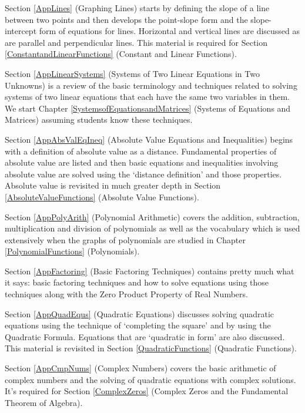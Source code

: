 \medskip

Section \ref{AppLines} (Graphing Lines) starts by defining the slope of a line between two points and then develops the point-slope form and the slope-intercept form of equations for lines.  Horizontal and vertical lines are discussed as are parallel and perpendicular lines.  This material is required for Section \ref{ConstantandLinearFunctions} (Constant and Linear Functions).

\medskip

Section \ref{AppLinearSystems} (Systems of Two Linear Equations in Two Unknowns) is a review of the basic terminology and techniques related to solving systems of two linear equations that each have the same two variables in them.  We start Chapter \ref{SystemsofEquationsandMatrices} (Systems of Equations and Matrices) assuming students know these techniques.

\medskip

Section \ref{AppAbsValEqIneq} (Absolute Value Equations and Inequalities) begins with a definition of absolute value as a distance.  Fundamental properties of absolute value are listed and then basic equations and inequalities involving absolute value are solved using the `distance definition' and those properties.  Absolute value is revisited in much greater depth in Section \ref{AbsoluteValueFunctions} (Absolute Value Functions).

\medskip

Section \ref{AppPolyArith} (Polynomial Arithmetic) covers the addition, subtraction, multiplication and division of polynomials as well as the vocabulary which is used extensively when the graphs of polynomials are studied in Chapter \ref{PolynomialFunctions} (Polynomials).

\medskip

Section \ref{AppFactoring} (Basic Factoring Techniques) contains pretty much what it says: basic factoring techniques and how to solve equations using those techniques along with the Zero Product Property of Real Numbers.

\medskip

Section \ref{AppQuadEqus} (Quadratic Equations) discusses solving quadratic equations using the technique of `completing the square' and by using the Quadratic Formula.  Equations that are `quadratic in form' are also discussed.  This material is revisited in Section \ref{QuadraticFunctions} (Quadratic Functions).

\medskip

Section \ref{AppCmpNums} (Complex Numbers) covers the basic arithmetic of complex numbers and the solving of quadratic equations with complex solutions.  It's required for Section \ref{ComplexZeros} (Complex Zeros and the Fundamental Theorem of Algebra).

